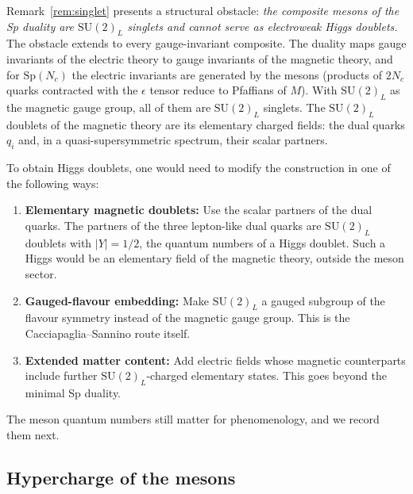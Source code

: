 \documentclass[11pt,a4paper]{article}
\theoremstyle{plain}
\theoremstyle{definition}
\theoremstyle{remark}
\newcommand{\Nc}{N_{\!c}}
\newcommand{\SU}[1]{\mathrm{SU}(#1)}
\newcommand{\Sp}[1]{\mathrm{Sp}(#1)}
\begin{document}
Remark~\ref{rem:singlet} presents a structural obstacle: \emph{the
composite mesons of the Sp duality are $\SU{2}_L$ singlets and cannot
serve as electroweak Higgs doublets.}  The obstacle extends to every
gauge-invariant composite.  The duality maps gauge invariants of the
electric theory to gauge invariants of the magnetic theory, and for
$\Sp{\Nc}$ the electric invariants are generated by the mesons (products
of $2\Nc$ quarks contracted with the $\epsilon$ tensor reduce to
Pfaffians of $M$).  With $\SU{2}_L$ as the magnetic gauge group, all of
them are $\SU{2}_L$ singlets.  The $\SU{2}_L$ doublets of the magnetic
theory are its elementary charged fields: the dual quarks $q_i$ and, in
a quasi-supersymmetric spectrum, their scalar partners.

To obtain Higgs doublets, one would need to modify the construction
in one of the following ways:
\begin{enumerate}
  \item \textbf{Elementary magnetic doublets:} Use the scalar partners
    of the dual quarks.  The partners of the three lepton-like dual
    quarks are $\SU{2}_L$ doublets with $|Y| = 1/2$, the quantum numbers
    of a Higgs doublet.  Such a Higgs would be an elementary field of the
    magnetic theory, outside the meson sector.
  \item \textbf{Gauged-flavour embedding:} Make $\SU{2}_L$ a gauged
    subgroup of the flavour symmetry instead of the magnetic gauge
    group.  This is the Cacciapaglia--Sannino route itself.
  \item \textbf{Extended matter content:} Add electric fields whose
    magnetic counterparts include further $\SU{2}_L$-charged elementary
    states.  This goes beyond the minimal Sp duality.
\end{enumerate}
The meson quantum numbers still matter for phenomenology, and we record
them next.

\subsection{Hypercharge of the mesons}
\end{document}
